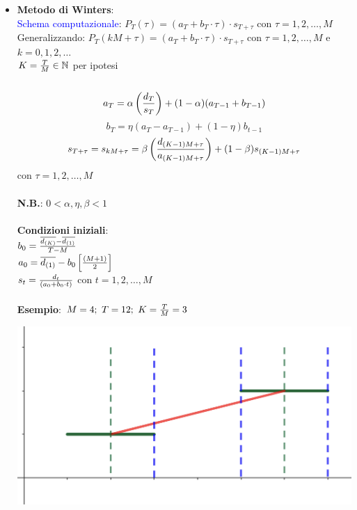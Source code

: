 \documentclass[12pt,a4paper]{article}
\begin{document}
\begin{itemize}
\item \textbf{Metodo di Winters}:\\
\textcolor{blue}{Schema computazionale}: $P_T(\tau)=(a_T+b_T\cdot \tau) \cdot s_{T+\tau}$ con $\tau = 1,2,\dots,M$\\
Generalizzando: $P_T(kM+\tau) = (a_T+b_T\cdot \tau)\cdot s_{T+\tau}$ con $\tau = 1,2,\dots, M$ e $k=0,1,2,\dots$\\
$K={T\over M} \in \mathbb{N}$ per ipotesi\\
\\
$$a_T = \alpha \left({d_T \over s_T}\right) + (1-\alpha)(a_{T-1} + b_{T-1})$$
$$b_T = \eta(a_T - a_{T-1}) + (1-\eta)b_{t-1}$$
$$s_{T+\tau} = s_{kM+\tau} = \beta \left({d_{(K-1)M+\tau} \over a_{(K-1)M+\tau}}\right) +(1-\beta)s_{(K-1)M + \tau}$$ con $\tau =1,2,\dots, M$\\
\\
\textbf{N.B.}: $0 < \alpha, \eta, \beta < 1$\\
\\
\textbf{Condizioni iniziali}:\\
$b_0 = {\overline{d_{(K)}} - \overline{d_{(1)}} \over T - M}$\\
$a_0 = \overline{d_{(1)}} - b_0 \left[{(M+1) \over 2}\right]$\\
$s_t = {d_t \over (a_0 + b_0 \cdot t)}$ con $t=1,2,\dots,M$\\
\\
\textbf{Esempio}:
$M=4; \ T=12;\ K ={T \over M} = 3$
\begin{center}
\includegraphics[width=0.4\columnwidth]{img/winters1.png}
\end{center}
\end{itemize}





\end{document}
